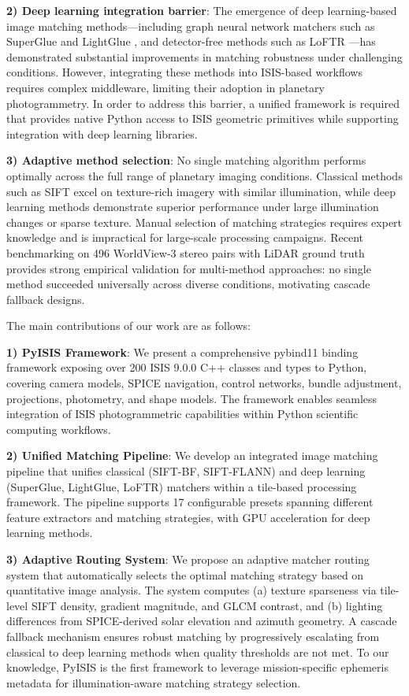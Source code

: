 \documentclass[lettersize,journal]{IEEEtran}
\newcommand{\pyisis}{PyISIS}
\begin{document}
\textbf{2) Deep learning integration barrier}: The emergence of deep learning-based image matching methods—including graph neural network matchers such as SuperGlue \cite{sarlin2020superglue} and LightGlue \cite{lindenberger2023lightglue}, and detector-free methods such as LoFTR \cite{sun2021loftr}—has demonstrated substantial improvements in matching robustness under challenging conditions. However, integrating these methods into ISIS-based workflows requires complex middleware, limiting their adoption in planetary photogrammetry. In order to address this barrier, a unified framework is required that provides native Python access to ISIS geometric primitives while supporting integration with deep learning libraries.

\textbf{3) Adaptive method selection}: No single matching algorithm performs optimally across the full range of planetary imaging conditions. Classical methods such as SIFT \cite{lowe2004sift} excel on texture-rich imagery with similar illumination, while deep learning methods demonstrate superior performance under large illumination changes or sparse texture. Manual selection of matching strategies requires expert knowledge and is impractical for large-scale processing campaigns. Recent benchmarking on 496 WorldView-3 stereo pairs with LiDAR ground truth \cite{satellite2024benchmark} provides strong empirical validation for multi-method approaches: no single method succeeded universally across diverse conditions, motivating cascade fallback designs.

The main contributions of our work are as follows:

\textbf{1) PyISIS Framework}: We present a comprehensive pybind11 binding framework exposing over 200 ISIS 9.0.0 C++ classes and types to Python, covering camera models, SPICE navigation, control networks, bundle adjustment, projections, photometry, and shape models. The framework enables seamless integration of ISIS photogrammetric capabilities within Python scientific computing workflows.

\textbf{2) Unified Matching Pipeline}: We develop an integrated image matching pipeline that unifies classical (SIFT-BF, SIFT-FLANN) and deep learning (SuperGlue, LightGlue, LoFTR) matchers within a tile-based processing framework. The pipeline supports 17 configurable presets spanning different feature extractors and matching strategies, with GPU acceleration for deep learning methods.

\textbf{3) Adaptive Routing System}: We propose an adaptive matcher routing system that automatically selects the optimal matching strategy based on quantitative image analysis. The system computes (a) texture sparseness via tile-level SIFT density, gradient magnitude, and GLCM contrast, and (b) lighting differences from SPICE-derived solar elevation and azimuth geometry. A cascade fallback mechanism ensures robust matching by progressively escalating from classical to deep learning methods when quality thresholds are not met. To our knowledge, \pyisis{} is the first framework to leverage mission-specific ephemeris metadata for illumination-aware matching strategy selection.
\end{document}
